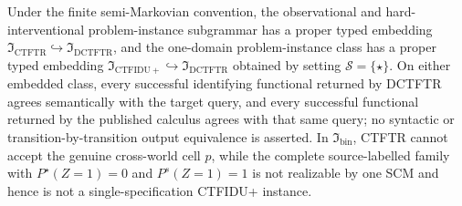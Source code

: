 Under the finite semi-Markovian convention, the observational and hard-interventional problem-instance subgrammar has a proper typed embedding \(\mathfrak I_{\mathrm{CTFTR}}\hookrightarrow\mathfrak I_{\mathrm{DCTFTR}}\), and the one-domain problem-instance class has a proper typed embedding \(\mathfrak I_{\mathrm{CTFIDU+}}\hookrightarrow\mathfrak I_{\mathrm{DCTFTR}}\) obtained by setting \(\mathcal S=\{\star\}\). On either embedded class, every successful identifying functional returned by DCTFTR agrees semantically with the target query, and every successful functional returned by the published calculus agrees with that same query; no syntactic or transition-by-transition output equivalence is asserted. In \(\mathfrak I_{\mathrm{bin}}\), CTFTR cannot accept the genuine cross-world cell \(p\), while the complete source-labelled family with \(P^\star(Z=1)=0\) and \(P^s(Z=1)=1\) is not realizable by one SCM and hence is not a single-specification CTFIDU+ instance.